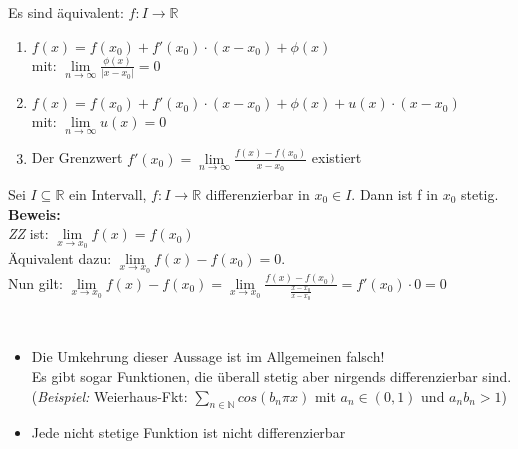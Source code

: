 \setcounter{Satz}{1} 
\setcounter{Definition}{5}

\begin{Satz}{
	Es sind äquivalent: $f : I \rightarrow \mathbb{R}$
	\begin{enumerate}
		\item $f(x) = f(x_0) + f'(x_0) \cdot (x-x_0) + \phi(x) $\\
		 mit: $\lim\limits_{n \rightarrow \infty}{\frac{\phi(x)}{|x-x_0|}} = 0$
	\item $ f(x) = f(x_0) + f'(x_0) \cdot (x-x_0) + \phi(x) + u(x)  \cdot (x-x_0)$ \\
	mit: $\lim\limits_{n \rightarrow \infty}{u(x)} = 0$
	\item Der Grenzwert 
	$f'(x_0) = \lim\limits_{n \rightarrow \infty}{\frac{f(x)-f(x_0)}{x-x_0}}$ 	
	existiert
	\end{enumerate}
}\end{Satz}

\begin{Satz}{\label{satz:satz_3}
	Sei $ I \subseteq \mathbb{R}$ ein Intervall, $f: I \rightarrow \mathbb{R}$ 
	differenzierbar in $x_0 \in I$. Dann ist f in $x_0$ stetig. \\
	\textbf{Beweis:} \\
		\noindent\hspace*{5mm}
		\textit{ZZ}  ist: $\lim\limits_{x \rightarrow x_0}{f(x) = f(x_0)}$ \\
		\noindent\hspace*{10mm}
		Äquivalent dazu: $\lim\limits_{x \rightarrow x_0}{f(x)-f(x_0) = 0}$. \\
		\noindent\hspace*{10mm}
		Nun gilt: $\lim\limits_{x \rightarrow x_0}{f(x) - f(x_0)} = 
	 \lim\limits_{x \rightarrow x_0}{\frac{f(x)-f(x_0)}{\frac{x-x_0}{x-x_0}}}
	 = f'(x_0) \cdot 0 = 0 $
}\end{Satz}
\begin{Bemerkung}{
	\textbf{ }\\
	 \begin{itemize}
	 	\item Die Umkehrung dieser Aussage ist im Allgemeinen falsch! \\
	 	Es gibt sogar Funktionen, die überall stetig aber nirgends 
	 	differenzierbar sind. \\
	 	(\textit{Beispiel:} Weierhaus-Fkt: $\sum_{n \in \mathbb{N}} cos(b_n \pi x)$
	 	mit $a_n \in (0,1)$ und $a_n b_n >1$)
	 	\item Jede nicht stetige Funktion ist nicht differenzierbar
	 \end{itemize}	 
}\end{Bemerkung}

